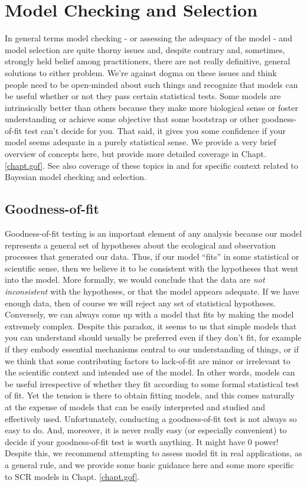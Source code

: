 \section{Model Checking and Selection}
\label{glms.sec.modsel}

In general terms model checking - or assessing the adequacy of the
model - and model selection are quite thorny issues and, despite
contrary and, sometimes, strongly held belief among practitioners, there are not
really definitive, general solutions to either problem. We're against
dogma on these issues and think people need to be open-minded about
such things and recognize that models can be useful whether or not
they pass certain statistical tests. Some models are intrinsically
better than others because they make more biological sense or foster
understanding or achieve some objective that some  bootstrap
or other goodness-of-fit test can't decide for you. That said, it
gives you some confidence if your model seems adequate in a purely statistical
sense.
We provide a very brief overview of concepts here, but provide more
detailed coverage in Chapt. \ref{chapt.gof}.
See also coverage of these topics in
\citet[][]{kery:2010} and
\citet[][]{link_barker:2010}
for specific context related to Bayesian
model checking and selection.

\subsection{Goodness-of-fit}
\label{glms.sec.gof}

Goodness-of-fit testing is an important element of any analysis
because  our model represents a general set of hypotheses
about the ecological and observation processes that generated our
data. Thus, if our model ``fits'' in some statistical or scientific
sense, then we believe it to be consistent with the hypotheses that
went into the model. More formally, we would conclude that the data
are {\it not inconsistent} with the hypotheses, or that the model
appears adequate. If we have enough
data, then of course we will reject any set of statistical hypotheses.
Conversely, we can always come up with a model that fits by making the
model extremely complex. Despite this paradox, it seems to us that
simple models that you can understand should usually be preferred even
if they don't fit, for example if they embody essential mechanisms
central to our understanding of things, or
if we think that some contributing factors to lack-of-fit are minor or
irrelevant to the scientific context and intended use of the model.
In other words, models can be useful irrespective of whether they fit
according to some formal statistical test of fit.  Yet
the tension is there to obtain fitting models, and this comes naturally at
the expense of models that can be easily interpreted and studied and
effectively used.
Unfortunately, conducting a goodness-of-fit test is
not always so easy to do. And, moreover, it is never really easy (or
especially convenient) to decide if your goodness-of-fit test is worth
anything. It might have 0 power!
Despite this,
we recommend attempting to assess model fit in real applications,
as a general rule, and we provide some basic guidance here and some more
specific to SCR models in
Chapt. \ref{chapt.gof}.


